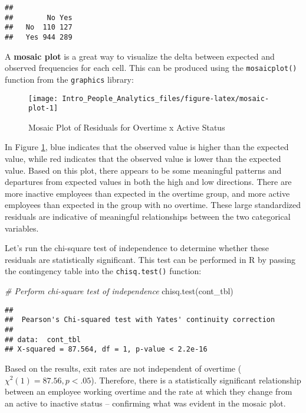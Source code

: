 \documentclass[
]{book}
\newenvironment{Shaded}{\begin{snugshade}}{\end{snugshade}}
\newcommand{\CommentTok}[1]{\textcolor[rgb]{0.56,0.35,0.01}{\textit{#1}}}
\newcommand{\FunctionTok}[1]{\textcolor[rgb]{0.00,0.00,0.00}{#1}}
\newcommand{\NormalTok}[1]{#1}
\begin{document}
\begin{verbatim}
##      
##        No Yes
##   No  110 127
##   Yes 944 289
\end{verbatim}

A \textbf{mosaic plot} is a great way to visualize the delta between expected and observed frequencies for each cell. This can be produced using the \texttt{mosaicplot()} function from the \texttt{graphics} library:

\begin{figure}

{\centering \texttt{[image: Intro\_People\_Analytics\_files/figure-latex/mosaic-plot-1]} 

}

\caption{Mosaic Plot of Residuals for Overtime x Active Status}\label{fig:mosaic-plot}
\end{figure}

In Figure \ref{fig:mosaic-plot}, blue indicates that the observed value is higher than the expected value, while red indicates that the observed value is lower than the expected value. Based on this plot, there appears to be some meaningful patterns and departures from expected values in both the high and low directions. There are more inactive employees than expected in the overtime group, and more active employees than expected in the group with no overtime. These large standardized residuals are indicative of meaningful relationships between the two categorical variables.

Let's run the chi-square test of independence to determine whether these residuals are statistically significant. This test can be performed in R by passing the contingency table into the \texttt{chisq.test()} function:

\begin{Shaded}
\begin{Highlighting}[]
\CommentTok{\# Perform chi{-}square test of independence}
\FunctionTok{chisq.test}\NormalTok{(cont\_tbl)}
\end{Highlighting}
\end{Shaded}

\begin{verbatim}
## 
##  Pearson's Chi-squared test with Yates' continuity correction
## 
## data:  cont_tbl
## X-squared = 87.564, df = 1, p-value < 2.2e-16
\end{verbatim}

Based on the results, exit rates are not independent of overtime (\({\chi}^2(1) = 87.56, p < .05\)). Therefore, there is a statistically significant relationship between an employee working overtime and the rate at which they change from an active to inactive status -- confirming what was evident in the mosaic plot.
\end{document}
